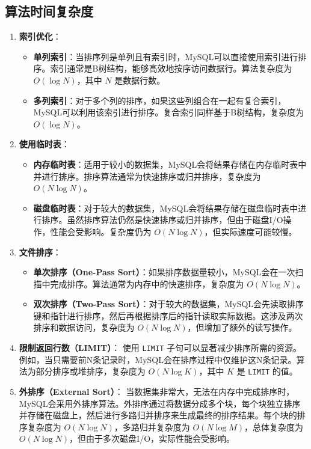 \documentclass{report}
\begin{document}
\subsection{算法时间复杂度}
\begin{enumerate}
    \item \textbf{索引优化}：
    \begin{itemize}
        \item \textbf{单列索引}：当排序列是单列且有索引时，MySQL可以直接使用索引进行排序。索引通常是B树结构，能够高效地按序访问数据行。算法复杂度为 $O(\log N)$，其中 $N$ 是数据行数。
        \item \textbf{多列索引}：对于多个列的排序，如果这些列组合在一起有复合索引，MySQL可以利用该索引进行排序。复合索引同样基于B树结构，复杂度为 $O(\log N)$。
    \end{itemize}
    
    \item \textbf{使用临时表}：
    \begin{itemize}
        \item \textbf{内存临时表}：适用于较小的数据集，MySQL会将结果存储在内存临时表中并进行排序。排序算法通常为快速排序或归并排序，复杂度为 $O(N \log N)$。
        \item \textbf{磁盘临时表}：对于较大的数据集，MySQL会将结果存储在磁盘临时表中进行排序。虽然排序算法仍然是快速排序或归并排序，但由于磁盘I/O操作，性能会受影响。复杂度仍为 $O(N \log N)$，但实际速度可能较慢。
    \end{itemize}
    
    \item \textbf{文件排序}：
    \begin{itemize}
        \item \textbf{单次排序（One-Pass Sort）}：如果排序数据量较小，MySQL会在一次扫描中完成排序。算法通常为内存中的快速排序，复杂度为 $O(N \log N)$。
        \item \textbf{双次排序（Two-Pass Sort）}：对于较大的数据集，MySQL会先读取排序键和指针进行排序，然后再根据排序后的指针读取实际数据。这涉及两次排序和数据访问，复杂度为 $O(N \log N)$，但增加了额外的读写操作。
    \end{itemize}
    
    \item \textbf{限制返回行数（LIMIT）}：
    使用 \verb|LIMIT| 子句可以显著减少排序所需的资源。例如，当只需要前N条记录时，MySQL会在排序过程中仅维护这N条记录。算法为部分排序或堆排序，复杂度为 $O(N \log K)$，其中 $K$ 是 \verb|LIMIT| 的值。
    
    \item \textbf{外排序（External Sort）}：
    当数据集非常大，无法在内存中完成排序时，MySQL会采用外排序算法。外排序通过将数据分成多个块，每个块独立排序并存储在磁盘上，然后进行多路归并排序来生成最终的排序结果。每个块的排序复杂度为 $O(N \log N)$，多路归并复杂度为 $O(N \log M)$，总体复杂度为 $O(N \log N)$，但由于多次磁盘I/O，实际性能会受影响。
    

\end{enumerate}
\end{document}
